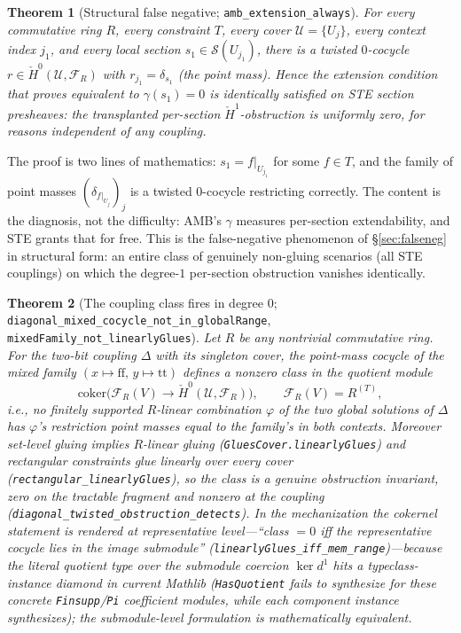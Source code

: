 \documentclass[11pt]{article}
\newtheorem{theorem}{Theorem}
\newcommand{\lean}[1]{\texttt{#1}}
\newcommand{\Hc}[1]{\check{H}^{#1}}
\newcommand{\FR}{\mathcal{F}_R}
\newcommand{\Sec}{\mathcal{S}}
\newcommand{\coker}{\mathrm{coker}}
\begin{document}
\begin{theorem}[Structural false negative;
\lean{amb\_extension\_always}]
\label{thm:degenerate}
For every commutative ring $R$, every constraint $T$, every cover
$\mathcal{U} = \{U_j\}$, every context index $j_1$, and every local
section $s_1 \in \Sec(U_{j_1})$, there is a twisted $0$-cocycle $r \in
\Hc{0}(\mathcal{U}, \FR)$ with $r_{j_1} = \delta_{s_1}$ (the point
mass).  Hence the extension condition that
\citet[Prop.~4.2]{abramsky2012cohomology} proves equivalent to
$\gamma(s_1) = 0$ is \emph{identically satisfied} on STE section
presheaves: the transplanted per-section $\Hc{1}$-obstruction is
uniformly zero, for reasons independent of any coupling.
\end{theorem}

The proof is two lines of mathematics: $s_1 = f|_{U_{j_1}}$ for some
$f \in T$, and the family of point masses $(\delta_{f|_{U_j}})_j$ is a
twisted $0$-cocycle restricting correctly.  The content is the
diagnosis, not the difficulty: AMB's $\gamma$ measures
per-section extendability, and STE grants that for free.  This is the
false-negative phenomenon of \S\ref{sec:falseneg} in structural form:
an entire class of genuinely non-gluing scenarios (all STE couplings)
on which the degree-$1$ per-section obstruction vanishes identically.

\begin{theorem}[The coupling class fires in degree $0$;
\lean{diagonal\_mixed\_cocycle\_not\_in\_globalRange},
\lean{mixedFamily\_not\_linearlyGlues}]
\label{thm:fires}
Let $R$ be any nontrivial commutative ring.  For the two-bit coupling
$\Delta$ with its singleton cover, the point-mass cocycle of the mixed
family $(x \mapsto \mathrm{ff},\, y \mapsto \mathrm{tt})$ defines a
\emph{nonzero} class in the quotient module
\[
\coker\bigl(\FR(V) \longrightarrow \Hc{0}(\mathcal{U}, \FR)\bigr),
\qquad \FR(V) = R^{(T)},
\]
i.e., no finitely supported $R$-linear combination $\varphi$ of the
two global solutions of $\Delta$ has $\varphi$'s restriction point
masses equal to the family's in both contexts.  Moreover set-level
gluing implies $R$-linear gluing
(\lean{GluesCover.linearlyGlues}) and rectangular
constraints glue linearly over every cover
(\lean{rectangular\_linearlyGlues}), so the class is a
genuine obstruction invariant, zero on the tractable fragment and
nonzero at the coupling (\lean{diagonal\_twisted\_obstruction\_detects}).
In the mechanization the cokernel statement is rendered at
representative level---``class $=0$ iff the representative cocycle
lies in the image submodule''
(\lean{linearlyGlues\_iff\_mem\_range})---because the literal quotient
type over the submodule coercion $\ker d^1$ hits a typeclass-instance
diamond in current Mathlib (\lean{HasQuotient} fails to synthesize for
these concrete \lean{Finsupp}/\lean{Pi} coefficient modules, while
each component instance synthesizes); the submodule-level formulation
is mathematically equivalent.
\end{theorem}
\end{document}
